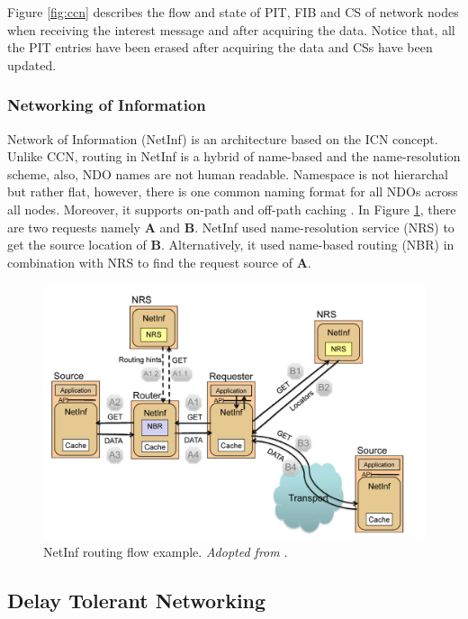 \noindent Figure \ref{fig:ccn} describes the flow and state of PIT, FIB and CS of network nodes when receiving the interest message and after acquiring the data. Notice that, all the PIT entries have been erased after acquiring the data and CSs have been updated.


\subsubsection{Networking of Information }
Network of Information (NetInf) is an architecture based on the ICN concept. Unlike CCN, routing in NetInf is a hybrid of name-based  and the name-resolution scheme, also, NDO names are not human readable. Namespace is not hierarchal but rather flat, however, there is one common naming format for all NDOs across all nodes. Moreover, it supports on-path and off-path caching \cite{Dannewitz:2013:NII:2459510.2459643}. In Figure \ref{fig:netinf}, there are two requests namely \textbf{A} and \textbf{B}.  NetInf used name-resolution service (NRS) to get the source location of \textbf{B}. Alternatively, it used name-based routing (NBR) in combination with NRS to find the request source of \textbf{A}.

\begin{figure}[H]
	\centering
	\includegraphics[scale=0.4]{images/netinf.png}
	\caption{NetInf routing flow example. \textit{Adopted from \cite{Dannewitz:2013:NII:2459510.2459643}}.}
	\label{fig:netinf}
\end{figure}



\subsection{Delay Tolerant Networking}

